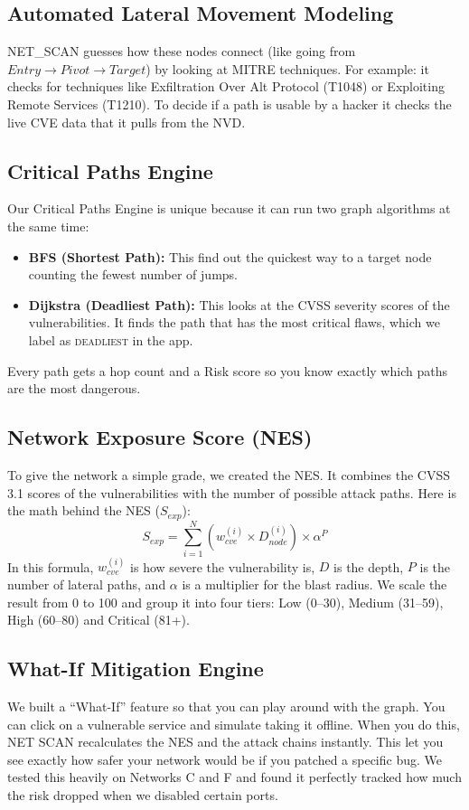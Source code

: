 \documentclass[conference]{IEEEtran}
\begin{document}
\subsection{Automated Lateral Movement Modeling}
NET\_SCAN guesses how these nodes connect (like going from $Entry \rightarrow Pivot \rightarrow Target$) by looking at MITRE techniques. For example: it checks for techniques like Exfiltration Over Alt Protocol (T1048) or Exploiting Remote Services (T1210). To decide if a path is usable by a hacker it checks the live CVE data that it pulls from the NVD.

\subsection{Critical Paths Engine}
Our Critical Paths Engine is unique because it can run two graph algorithms at the same time:
\begin{itemize}
    \item \textbf{BFS (Shortest Path):} This find out the quickest way to a target node counting the fewest number of jumps.
    \item \textbf{Dijkstra (Deadliest Path):} This looks at the CVSS severity scores of the vulnerabilities. It finds the path that has the most critical flaws, which we label as \textsc{deadliest} in the app.
\end{itemize}
Every path gets a hop count and a Risk score so you know exactly which paths are the most dangerous.

\subsection{Network Exposure Score (NES)}
To give the network a simple grade, we created the NES. It combines the CVSS 3.1 scores of the vulnerabilities with the number of possible attack paths.
Here is the math behind the NES ($S_{exp}$):
\begin{equation}
S_{exp} = \sum_{i=1}^{N} (w_{cve}^{(i)} \times D_{node}^{(i)}) \times \alpha^{P}
\end{equation}
In this formula, $w_{cve}^{(i)}$ is how severe the vulnerability is, $D$ is the depth, $P$ is the number of lateral paths, and $\alpha$ is a multiplier for the blast radius. We scale the result from 0 to 100 and group it into four tiers: Low (0--30), Medium (31--59), High (60--80) and Critical (81+).

\subsection{What-If Mitigation Engine}
We built a ``What-If'' feature so that you can play around with the graph. You can click on a vulnerable service and simulate taking it offline. When you do this, NET SCAN recalculates the NES and the attack chains instantly. This let you see exactly how safer your network would be if you patched a specific bug. We tested this heavily on Networks C and F and found it perfectly tracked how much the risk dropped when we disabled certain ports.
\end{document}
